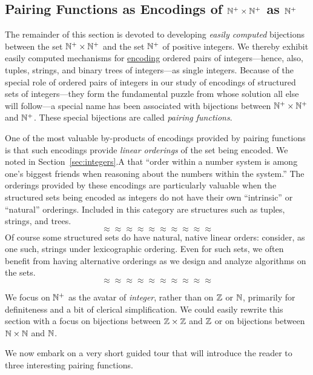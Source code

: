 \subsection{Pairing Functions as Encodings of $\mathbb{N}^+ \times \mathbb{N}^+$ as $\mathbb{N}^+$}
\label{sec:building-pairing-functions}

The remainder of this section is devoted to developing {\em easily
  computed} bijections between the set $\mathbb{N}^+ \times \mathbb{N}^+$ and the set
$\mathbb{N}^+$ of positive integers.  We thereby exhibit easily computed
mechanisms for \underline{encoding} ordered pairs of integers---hence,
also, tuples, strings, and binary trees of integers---as single
integers.  Because of the special role of ordered pairs of integers in
our study of encodings of structured sets of integers---they form the
fundamental puzzle from whose solution all else will follow---a
special name has been associated with bijections between $\mathbb{N}^+ \times
\mathbb{N}^+$ and $\mathbb{N}^+$.  These special bijections are called {\it pairing
  functions}.  

One of the most valuable by-products of encodings provided by pairing
functions is that such encodings provide {\em linear orderings} of the
set being encoded.  We noted in Section~\ref{sec:integers}.A that
``order within a number system is among one's biggest friends when
reasoning about the numbers within the system.''  The orderings
provided by these encodings are particularly
valuable when the structured sets being encoded as integers do not
have their own ``intrinsic'' or ``natural'' orderings.  Included in
this category are  structures such as tuples,
strings, and trees.
\[ \approx \approx \approx \approx \approx \approx \approx \approx \approx \approx \]
Of course some structured sets do have natural, native linear orders:
consider, as one such, strings under lexicographic ordering.  Even for
such sets, we often benefit from having alternative orderings as we
design and analyze algorithms on the sets.
\[ \approx \approx \approx \approx \approx \approx \approx \approx \approx \approx \]

We focus on $\mathbb{N}^+$ as the avatar of {\it integer}, rather than on $\mathbb{Z}$
or $\mathbb{N}$, primarily for definiteness and a bit of clerical
simplification.  We could easily rewrite this section with a focus on
bijections between $\mathbb{Z} \times \mathbb{Z}$ and $\mathbb{Z}$ or on bijections between
$\mathbb{N} \times \mathbb{N}$ and $\mathbb{N}$.

\bigskip


We now embark on a very short guided tour that will introduce the
reader to three interesting pairing functions.

